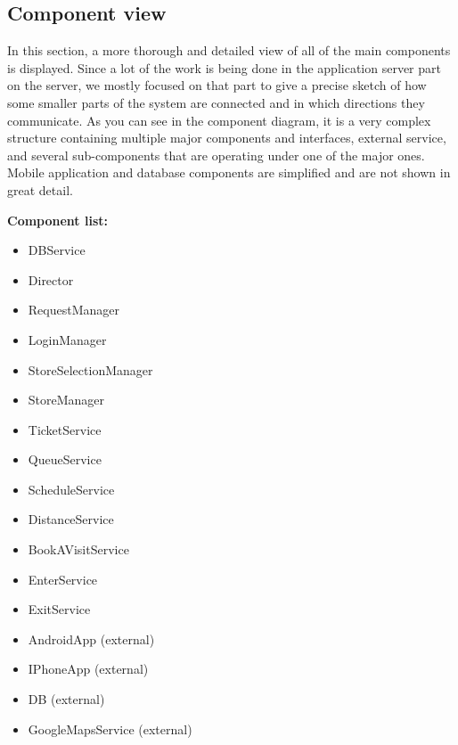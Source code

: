 \newpage 

\subsection{Component view}
\label{sec:componentview}

In this section, a more thorough and detailed view of all of the main components is displayed. Since a lot of the work is being done in the application server part on the server, we mostly focused on that part to give a precise sketch of how some smaller parts of the system are connected and in which directions they communicate. As you can see in the component diagram, it is a very complex structure containing multiple major components and interfaces, external service, and several sub-components that are operating under one of the major ones. Mobile application and database components are simplified and are not shown in great detail. \newline

\textbf{Component list:}
\begin{itemize}
\item DBService
\item Director
\item RequestManager
\item LoginManager 
\item StoreSelectionManager 
\item StoreManager
\item TicketService 
\item QueueService 
\item ScheduleService
\item DistanceService 
\item BookAVisitService
\item EnterService 
\item ExitService 
\item AndroidApp (external) 
\item IPhoneApp (external)
\item DB (external) 
\item GoogleMapsService (external) 
\end{itemize}

